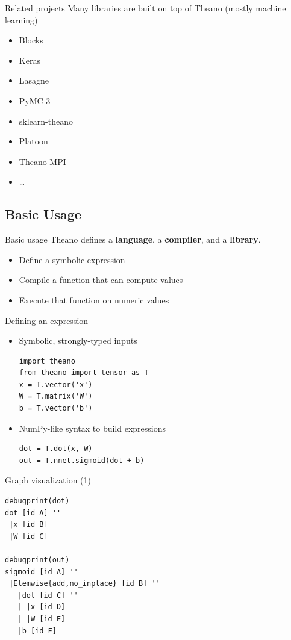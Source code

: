 \documentclass[a4paper,9pt]{beamer}
\begin{document}
\begin{frame}{Related projects}
  Many libraries are built on top of Theano (mostly machine learning)
  \begin{itemize}
  \item Blocks
  \item Keras
  \item Lasagne
  \item PyMC 3
  \item sklearn-theano
  \item Platoon
  \item Theano-MPI
  \item \ldots
  \end{itemize}
\end{frame}


\subsection{Basic Usage}
\begin{frame}{Basic usage}
  Theano defines a {\bf language}, a {\bf compiler}, and a {\bf library}.
  \begin{itemize}
    \item Define a symbolic expression
    \item Compile a function that can compute values
    \item Execute that function on numeric values
  \end{itemize}
\end{frame}

\begin{frame}[fragile]{Defining an expression}
  \begin{itemize}
    \item Symbolic, strongly-typed inputs
      \begin{verbatim}
import theano
from theano import tensor as T
x = T.vector('x')
W = T.matrix('W')
b = T.vector('b')
    \end{verbatim}
    \item NumPy-like syntax to build expressions
      \begin{verbatim}
dot = T.dot(x, W)
out = T.nnet.sigmoid(dot + b)
      \end{verbatim}
  \end{itemize}
\end{frame}

\begin{frame}[fragile]{Graph visualization (1)}
  \begin{verbatim}
debugprint(dot)
dot [id A] ''   
 |x [id B]
 |W [id C]

debugprint(out)
sigmoid [id A] ''   
 |Elemwise{add,no_inplace} [id B] ''   
   |dot [id C] ''   
   | |x [id D]
   | |W [id E]
   |b [id F]
  \end{verbatim}
\end{frame}
\end{document}
